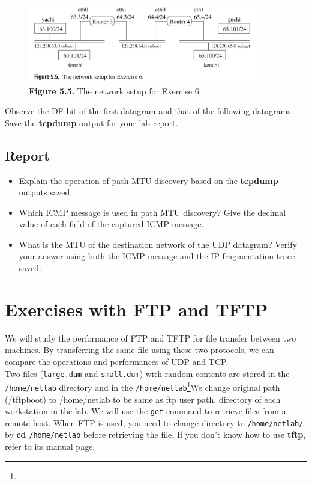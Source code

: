 \documentclass[10pt,a4paper]{article}
\numberwithin{equation}{section}
\numberwithin{figure}{section}
\numberwithin{table}{section}
\begin{document}
	\begin{figure}[H]
		\centering
		\includegraphics[width=0.9\textwidth]{img/figure5-5.jpg}
		\caption{\textbf{Figure 5.5.} The network setup for Exercise 6}
		\label{fig:5.5}
	\end{figure}

	Observe the DF bit of the first datagram and that of the following datagrams. Save the \textbf{tcpdump} output for your lab report.\\

	\subsection*{Report}
	\begin{itemize}
		\item Explain the operation of path MTU discovery based on the \textbf{tcpdump} outputs saved.
		\item Which ICMP message is used in path MTU discovery? Give the decimal value of each field of the captured ICMP message.
		\item What is the MTU of the destination network of the UDP datagram? Verify your answer using both the ICMP message and the IP fragmentation trace saved.
	\end{itemize}

\section*{Exercises with FTP and TFTP}
   We will study the performance of FTP and TFTP for file transfer between two machines.
   By transferring the same file using these two protocols, we can compare the operations and performances of UDP and TCP. \\
   Two files (\texttt{large.dum} and \texttt{small.dum}) with random contents are stored in the \texttt{/home/netlab} directory and in the \texttt{/home/netlab}\footnote{}{We change original path (/tftpboot) to /home/netlab to be same as ftp user path.} directory of each workstation in the lab.
   We will use the \texttt{get} command to retrieve files from a remote host.
   When FTP is used, you need to change directory to \texttt{/home/netlab/} by \textbf{cd} \texttt{/home/netlab} before retrieving the file.
   If you don’t know how to use \textbf{tftp}, refer to its manual page.
\end{document}
